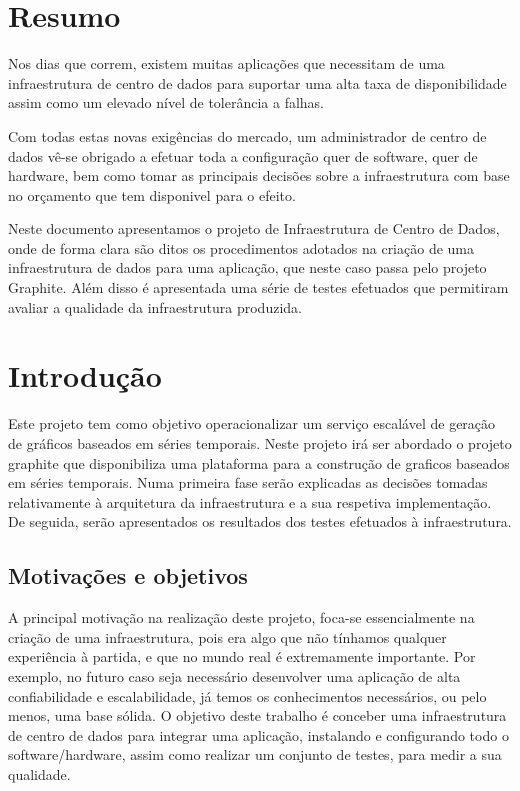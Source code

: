 \section{Resumo}
Nos dias que correm, existem muitas aplicações que necessitam de uma infraestrutura de centro de dados para suportar uma alta taxa de disponibilidade assim como um elevado nível de tolerância a falhas.

Com todas estas novas exigências do mercado, um administrador de centro de dados vê-se obrigado a efetuar toda a configuração quer de software, quer de hardware, bem como tomar as principais decisões sobre a infraestrutura com base no orçamento que tem disponivel para o efeito.

Neste documento apresentamos o projeto de Infraestrutura de Centro de Dados, onde de forma clara são ditos os procedimentos adotados na criação de uma infraestrutura de dados para uma aplicação, que neste caso passa pelo projeto Graphite. Além disso é apresentada uma série de testes efetuados que permitiram avaliar a qualidade da infraestrutura produzida.

\section{Introdução}
Este projeto tem como objetivo operacionalizar um serviço escalável de geração de gráficos baseados em séries temporais.
Neste projeto irá ser abordado o projeto graphite que disponibiliza uma plataforma para a construção de graficos baseados em séries temporais.
Numa primeira fase serão explicadas as decisões tomadas relativamente à arquitetura da infraestrutura e a sua respetiva implementação.
De seguida, serão apresentados os resultados dos testes efetuados à infraestrutura.

\subsection{Motivações e objetivos}

A principal motivação na realização deste projeto, foca-se essencialmente na criação de uma infraestrutura, pois era algo que não tínhamos qualquer experiência à partida, e que no mundo real é extremamente importante. Por exemplo, no futuro caso seja necessário desenvolver uma aplicação de alta confiabilidade e escalabilidade, já temos os conhecimentos
necessários, ou pelo menos, uma base sólida.
O objetivo deste trabalho é conceber uma infraestrutura de centro de dados para integrar uma aplicação, instalando e configurando todo o software/hardware, assim como realizar um conjunto de testes, para medir a sua qualidade.

